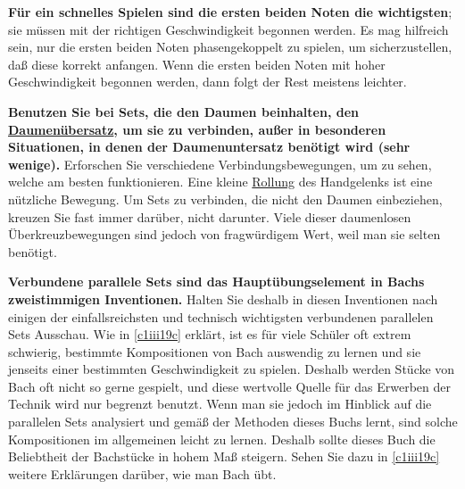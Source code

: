 \textbf{Für ein schnelles Spielen sind die ersten beiden Noten die wichtigsten}; sie müssen mit der richtigen Geschwindigkeit begonnen werden.
Es mag hilfreich sein, nur die ersten beiden Noten phasengekoppelt zu spielen, um sicherzustellen, daß diese korrekt anfangen.
Wenn die ersten beiden Noten mit hoher Geschwindigkeit begonnen werden, dann folgt der Rest meistens leichter.

\textbf{Benutzen Sie bei Sets, die den Daumen beinhalten, den \hyperref[c1iii5a]{Daumenübersatz}, um sie zu verbinden, außer in besonderen Situationen, in denen der Daumenuntersatz benötigt wird (sehr wenige).}
Erforschen Sie verschiedene Verbindungsbewegungen, um zu sehen, welche am besten funktionieren.
Eine kleine \hyperref[Rollung]{Rollung} des Handgelenks ist eine nützliche Bewegung.
Um Sets zu verbinden, die nicht den Daumen einbeziehen, kreuzen Sie fast immer darüber, nicht darunter.
Viele dieser daumenlosen Überkreuzbewegungen sind jedoch von fragwürdigem Wert, weil man sie selten benötigt.

\textbf{Verbundene parallele Sets sind das Hauptübungselement in Bachs zweistimmigen Inventionen.}
Halten Sie deshalb in diesen Inventionen nach einigen der einfallsreichsten und technisch wichtigsten verbundenen parallelen Sets Ausschau.
Wie in \hyperref[c1iii19c]{\autoref{c1iii19c}} erklärt, ist es für viele Schüler oft extrem schwierig, bestimmte Kompositionen von Bach auswendig zu lernen und sie jenseits einer bestimmten Geschwindigkeit zu spielen.
Deshalb werden Stücke von Bach oft nicht so gerne gespielt, und diese wertvolle Quelle für das Erwerben der Technik wird nur begrenzt benutzt.
Wenn man sie jedoch im Hinblick auf die parallelen Sets analysiert und gemäß der Methoden dieses Buchs lernt, sind solche Kompositionen im allgemeinen leicht zu lernen.
Deshalb sollte dieses Buch die Beliebtheit der Bachstücke in hohem Maß steigern.
Sehen Sie dazu in \hyperref[c1iii19c]{\autoref{c1iii19c}} weitere Erklärungen darüber, wie man Bach übt.

